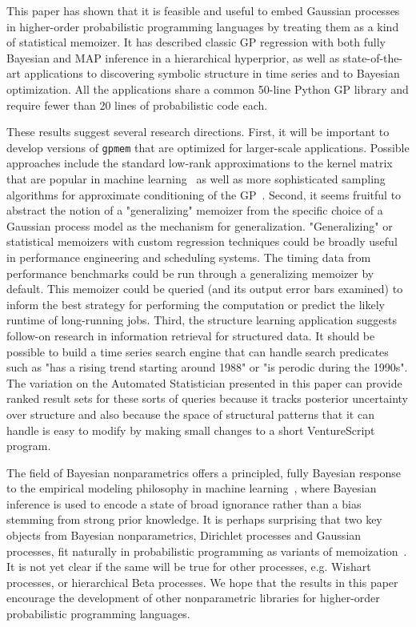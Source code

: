 This paper has shown that it is feasible and useful to embed Gaussian processes
in higher-order probabilistic programming languages by treating them as a kind
of statistical memoizer. It has described classic GP regression with both fully
Bayesian and MAP inference in a hierarchical hyperprior, as well as state-of-the-art
applications to discovering symbolic structure in time series and to Bayesian optimization.
All the applications share a common 50-line Python GP library and require fewer than 20 lines
of probabilistic code each.

These results suggest several research directions. First, it will be important
to develop versions of {\tt gpmem} that are optimized for larger-scale
applications. Possible approaches include the standard low-rank approximations
to the kernel matrix that are popular in machine learning~\citep{bui2014tree} as well
as more sophisticated sampling algorithms for approximate conditioning of the
GP~\citep{lawrence2009efficient}.
Second, it seems fruitful to abstract the notion of a "generalizing" memoizer
from the specific choice of a Gaussian process model as the mechanism for
generalization. "Generalizing" or statistical memoizers with custom regression techniques could be broadly useful in performance engineering and scheduling systems.
The timing data from performance benchmarks could be run through a generalizing memoizer by default.
This memoizer could be queried (and its output error bars examined) to inform the best strategy
for performing the computation or predict the likely runtime of long-running jobs.
 Third, the structure learning application suggests follow-on research in information
retrieval for structured data. It should be possible to build a time series search engine
that can handle search predicates such as "has a rising trend starting around
1988" or "is perodic during the 1990s".
The variation on the Automated Statistician presented in this paper can provide ranked result
sets for these sorts of queries because it tracks posterior uncertainty over structure and also
because the space of structural patterns that it can handle is easy to modify by making small
changes to a short VentureScript program.


The field of Bayesian nonparametrics offers a principled, fully Bayesian
response to the empirical modeling philosophy in machine learning~\citep{ghahramani2013bayesian},
where Bayesian inference is used to encode a state of broad ignorance rather
than a bias stemming from strong prior knowledge. It is perhaps surprising that
two key objects from Bayesian nonparametrics, Dirichlet processes and Gaussian
processes, fit naturally in probabilistic programming as variants of
memoization~\citep{roy2008stochastic}. It is not yet clear if the same will be true
for other processes, e.g. Wishart processes, or hierarchical Beta processes. We hope that the results in this paper encourage the development of other nonparametric libraries for higher-order probabilistic programming languages.
